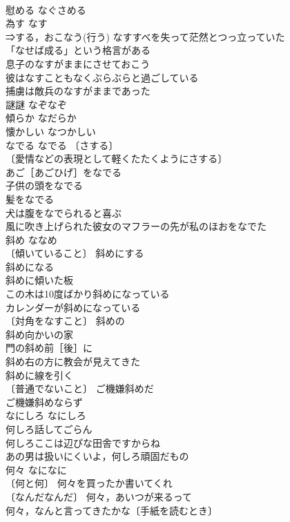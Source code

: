 \documentclass[8pt]{extreport}
\begin{document}
\begin{CJK}{UTF8}{min}
\\	慰める	なぐさめる	
\\	為す	なす	
\\	⇒する，おこなう(行う) なすすべを失って茫然とつっ立っていた 
\\	「なせば成る」という格言がある 
\\	息子のなすがままにさせておこう 
\\	彼はなすこともなくぶらぶらと過ごしている 
\\	捕虜は敵兵のなすがままであった 
\\	謎謎	なぞなぞ	
\\	傾らか	なだらか	
\\	懐かしい	なつかしい	
\\	なでる	なでる	〔さする〕
\\	〔愛情などの表現として軽くたたくようにさする〕
\\	あご［あごひげ］をなでる 
\\	子供の頭をなでる 
\\	髪をなでる 
\\	犬は腹をなでられると喜ぶ 
\\	風に吹き上げられた彼女のマフラーの先が私のほおをなでた 
\\	斜め	ななめ	
\\	〔傾いていること〕 斜めにする 
\\	斜めになる 
\\	斜めに傾いた板 
\\	この木は10度ばかり斜めになっている 
\\	カレンダーが斜めになっている 
\\	〔対角をなすこと〕 斜めの 
\\	斜め向かいの家 
\\	門の斜め前［後］に 
\\	斜め右の方に教会が見えてきた 
\\	斜めに線を引く 
\\	〔普通でないこと〕 ご機嫌斜めだ 
\\	ご機嫌斜めならず 
\\	なにしろ	なにしろ	
\\	何しろ話してごらん 
\\	何しろここは辺ぴな田舎ですからね 
\\	あの男は扱いにくいよ，何しろ頑固だもの 
\\	何々	なになに	
\\	〔何と何〕 何々を買ったか書いてくれ 
\\	〔なんだなんだ〕 何々，あいつが来るって 
\\	何々，なんと言ってきたかな〔手紙を読むとき〕 

\end{CJK}
\end{document}
